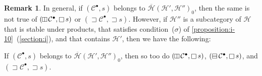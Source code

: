 \documentclass[a4paper,fleqn]{article}
\theoremstyle{plain}
\newenvironment{theorem}[1]
  {\renewcommand\theinnertheorem{#1}\innertheorem}
  {\endinnertheorem}
\theoremstyle{definition}
\newtheorem*{remark}{Remark}
\newcommand{\CC}{\mathcal{C}}
\newcommand{\HH}{\mathcal{H}}
\newcommand{\hsqbox}{{\boxminus}}
\newcommand{\vsqbox}{{\rotatebox{90}{$\boxminus$}}}
\DeclareMathOperator{\sq}{\square}
\DeclareMathOperator{\hsq}{\raisebox{-.05em}{$\hsqbox$}}
\DeclareMathOperator{\vsq}{\raisebox{-.1em}{$\vsqbox$}}
\DeclareMathOperator{\trio}{\sqsupset}
\newcommand{\smallbullet}{\bullet}
\begin{document}
\begin{remark}
  In general, if $(\CC^\smallbullet,s)$ belongs to $\overline{\HH}(\HH',\HH'')_0$, then the same is not true of $(\vsq\CC^\smallbullet,\sq s)$ or $(\trio\CC^\smallbullet,\trio s)$.
  However, if $\HH''$ is a subcategory of $\HH$ that is stable under products, that satisfies condition~($\sigma$) of \cref{proposition:i-10}~(\cref{section:i}), and that contains $\HH'$, then we have the following:
\end{remark}

\begin{theorem}{18}
\label{theorem:ii-18}
  If $(\CC^\smallbullet,s)$ belongs to $\overline{\HH}(\HH',\HH'')_0$, then so too do $(\vsq\CC^\smallbullet,\sq s)$, $(\hsq\CC^\smallbullet,\sq s)$, and $(\trio\CC^\smallbullet,\trio s)$.
\end{theorem}
\end{document}
